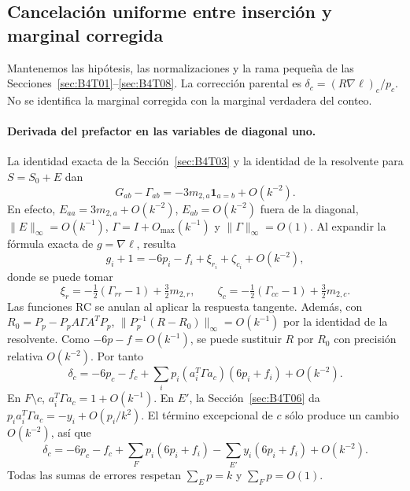 \subsection{Cancelación uniforme entre inserción y marginal corregida}\label{sec:B4T09}
Mantenemos las hipótesis, las normalizaciones y la rama pequeña de las
Secciones~\ref{sec:B4T01}--\ref{sec:B4T08}.
La corrección parental es $\delta_c=(R\nabla\ell)_c/p_c$.
No se identifica la marginal corregida con la marginal verdadera del conteo.

\paragraph{Derivada del prefactor en las variables de diagonal uno.}
La identidad exacta de la Sección~\ref{sec:B4T03} y la identidad de la resolvente para $S=S_0+E$ dan
\[
 G_{ab}-\Gamma_{ab}=-3m_{2,a}\mathbf1_{a=b}+O(k^{-2}).
\]
En efecto, $E_{aa}=3m_{2,a}+O(k^{-2})$, $E_{ab}=O(k^{-2})$
fuera de la diagonal, $\|E\|_\infty=O(k^{-1})$,
$\Gamma=I+O_{\max}(k^{-1})$ y $\|\Gamma\|_\infty=O(1)$.
Al expandir la fórmula exacta de $g=\nabla\ell$, resulta
\[
 g_i+1=-6p_i-f_i+\xi_{r_i}+\zeta_{c_i}+O(k^{-2}),
\]
donde se puede tomar
\[
 \xi_r=-\tfrac12(\Gamma_{rr}-1)+\tfrac32m_{2,r},\qquad
 \zeta_c=-\tfrac12(\Gamma_{cc}-1)+\tfrac32m_{2,c}.
\]
Las funciones RC se anulan al aplicar la respuesta tangente.
Además, con $R_0=P_p-P_pA\Gamma A^TP_p$,
$\|P_p^{-1}(R-R_0)\|_\infty=O(k^{-1})$ por la identidad de la resolvente.
Como $-6p-f=O(k^{-1})$, se puede sustituir $R$ por $R_0$ con precisión
relativa $O(k^{-2})$. Por tanto
\[
 \delta_c=-6p_c-f_c+
 \sum_i p_i(a_i^T\Gamma a_c)(6p_i+f_i)+O(k^{-2}).
\]
En $F\setminus c$, $a_i^T\Gamma a_c=1+O(k^{-1})$.
En $E'$, la Sección~\ref{sec:B4T06} da $p_i a_i^T\Gamma a_c=-y_i+O(p_i/k^2)$.
El término excepcional de $c$ sólo produce un cambio $O(k^{-2})$, así que
\[
 \boxed{\delta_c=-6p_c-f_c+
 \sum_Fp_i(6p_i+f_i)-\sum_{E'}y_i(6p_i+f_i)+O(k^{-2}).}
\]
Todas las sumas de errores respetan $\sum_Ep=k$ y $\sum_Fp=O(1)$.


